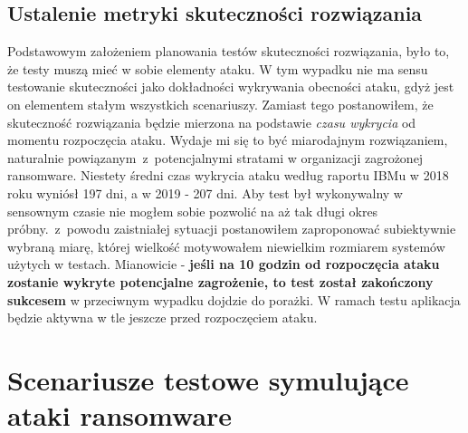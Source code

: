 \subsection{Ustalenie metryki skuteczności rozwiązania}
Podstawowym założeniem planowania testów skuteczności rozwiązania, było to, że testy muszą mieć w sobie elementy ataku. W tym wypadku nie ma sensu testowanie skuteczności jako dokładności wykrywania obecności ataku, gdyż jest on elementem stałym wszystkich scenariuszy. Zamiast tego postanowiłem, że skuteczność rozwiązania będzie mierzona na podstawie \emph{czasu wykrycia} od momentu rozpoczęcia ataku. Wydaje mi się to być miarodajnym rozwiązaniem, naturalnie powiązanym~z~potencjalnymi stratami w organizacji zagrożonej ransomware.
\newline
Niestety średni czas wykrycia ataku według raportu IBMu w 2018 roku wyniósł 197 dni, a w 2019 - 207 dni. Aby test był wykonywalny w sensownym czasie nie mogłem sobie pozwolić na aż tak długi okres próbny.~z~powodu zaistniałej sytuacji postanowiłem zaproponować subiektywnie wybraną miarę, której wielkość motywowałem niewielkim rozmiarem systemów użytych w testach. Mianowicie - \textbf{jeśli na 10 godzin od rozpoczęcia ataku zostanie wykryte potencjalne zagrożenie, to test został zakończony sukcesem} w przeciwnym wypadku dojdzie do porażki. W ramach testu aplikacja będzie aktywna w tle jeszcze przed rozpoczęciem ataku.
\section{Scenariusze testowe symulujące ataki ransomware}
